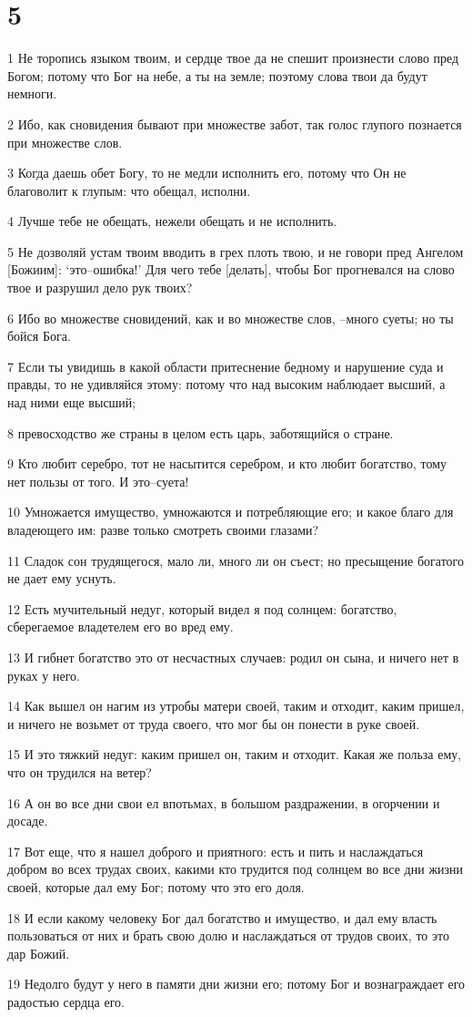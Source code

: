 \chapter{5}

\par 1 Не торопись языком твоим, и сердце твое да не спешит произнести слово пред Богом; потому что Бог на небе, а ты на земле; поэтому слова твои да будут немноги.
\par 2 Ибо, как сновидения бывают при множестве забот, так голос глупого познается при множестве слов.
\par 3 Когда даешь обет Богу, то не медли исполнить его, потому что Он не благоволит к глупым: что обещал, исполни.
\par 4 Лучше тебе не обещать, нежели обещать и не исполнить.
\par 5 Не дозволяй устам твоим вводить в грех плоть твою, и не говори пред Ангелом [Божиим]: `это--ошибка!' Для чего тебе [делать], чтобы Бог прогневался на слово твое и разрушил дело рук твоих?
\par 6 Ибо во множестве сновидений, как и во множестве слов, --много суеты; но ты бойся Бога.
\par 7 Если ты увидишь в какой области притеснение бедному и нарушение суда и правды, то не удивляйся этому: потому что над высоким наблюдает высший, а над ними еще высший;
\par 8 превосходство же страны в целом есть царь, заботящийся о стране.
\par 9 Кто любит серебро, тот не насытится серебром, и кто любит богатство, тому нет пользы от того. И это--суета!
\par 10 Умножается имущество, умножаются и потребляющие его; и какое благо для владеющего им: разве только смотреть своими глазами?
\par 11 Сладок сон трудящегося, мало ли, много ли он съест; но пресыщение богатого не дает ему уснуть.
\par 12 Есть мучительный недуг, который видел я под солнцем: богатство, сберегаемое владетелем его во вред ему.
\par 13 И гибнет богатство это от несчастных случаев: родил он сына, и ничего нет в руках у него.
\par 14 Как вышел он нагим из утробы матери своей, таким и отходит, каким пришел, и ничего не возьмет от труда своего, что мог бы он понести в руке своей.
\par 15 И это тяжкий недуг: каким пришел он, таким и отходит. Какая же польза ему, что он трудился на ветер?
\par 16 А он во все дни свои ел впотьмах, в большом раздражении, в огорчении и досаде.
\par 17 Вот еще, что я нашел доброго и приятного: есть и пить и наслаждаться добром во всех трудах своих, какими кто трудится под солнцем во все дни жизни своей, которые дал ему Бог; потому что это его доля.
\par 18 И если какому человеку Бог дал богатство и имущество, и дал ему власть пользоваться от них и брать свою долю и наслаждаться от трудов своих, то это дар Божий.
\par 19 Недолго будут у него в памяти дни жизни его; потому Бог и вознаграждает его радостью сердца его.

